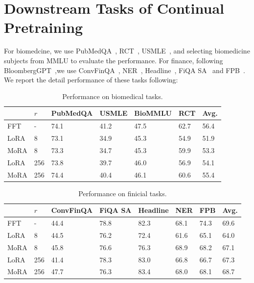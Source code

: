 \documentclass[11pt]{article}
\begin{document}
\section{Downstream Tasks of Continual Pretraining}
\label{sec:domain_adaptation}
For biomedcine, we use PubMedQA~\cite{jin2019pubmedqa}, RCT~\cite{dernoncourt2017pubmed}, USMLE~\cite{jin2021disease}, and selecting biomedicine subjects from MMLU to evaluate the performance.
For finance, following BloombergGPT~\cite{wu2023bloomberggpt},we use ConvFinQA~\cite{chen2022convfinqa}, NER~\cite{salinas-alvarado-etal-2015-domain}, Headline~\cite{sinha2021impact}, FiQA SA~\cite{maia201818} and FPB~\cite{malo2014good}.
We report the detail performance of these tasks following:

\begin{table}[h]
\label{table:bio}
\small
\centering
 \begin{tabularx}{0.9\textwidth}{XYYYYYY}
  \toprule
    & $r$& \textbf{PubMedQA} & \textbf{USMLE} & \textbf{BioMMLU} & \textbf{RCT} & \textbf{Avg.} \\ \hline
FFT  & -   & 74.1 & 41.2 & 47.5 & 62.7 & 56.4 \\
LoRA & 8   & 73.1 & 34.9 & 45.3 & 54.9 & 51.9 \\
MoRA & 8   & 73.3 & 34.7 & 45.3 & 59.9 & 53.3 \\
LoRA & 256 & 73.8 & 39.7 & 46.0 & 56.9 & 54.1 \\
MoRA & 256 & 74.4 & 40.4 & 46.1 & 60.6 & 55.4 \\
\bottomrule
\end{tabularx}
\caption{Performance on biomedical tasks.}
\end{table}

\begin{table}[h]
\label{table:fin}
\small
\centering
 \begin{tabularx}{0.90\textwidth}{XYYYYYYY}
  \toprule
& $r$    & \textbf{ConvFinQA} & \textbf{FiQA SA} & \textbf{Headline} & \textbf{NER} & \textbf{FPB}& \textbf{Avg.} \\ \hline
FFT  & -   & 44.4 & 78.8 & 82.3 & 68.1 & 74.3 & 69.6 \\
LoRA & 8   & 44.5 & 76.2 & 72.4 & 61.6 & 65.1 &64.0 \\
MoRA & 8   & 45.8 & 76.6 & 76.3 & 68.9 & 68.2 &67.1 \\
LoRA &  256& 41.4 & 78.3 & 83.0 & 66.8 & 66.7 & 67.3  \\
MoRA & 256 & 47.7 & 76.3 & 83.4 & 68.0 & 68.1 & 68.7 \\
\bottomrule
\end{tabularx}
\caption{Performance on finicial tasks.}
\end{table}



\end{document}
